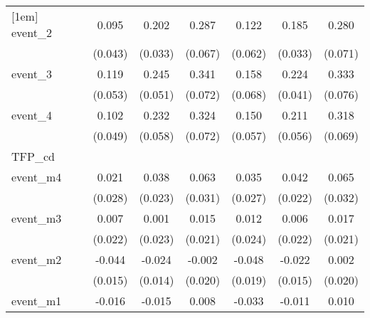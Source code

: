 {\begin{tabular}{l*{6}{c}}
[1em]
event\_2     &       0.095\sym{*}  &       0.202\sym{***}&       0.287\sym{***}&       0.122\sym{*}  &       0.185\sym{***}&       0.280\sym{***}\\
            &     (0.043)         &     (0.033)         &     (0.067)         &     (0.062)         &     (0.033)         &     (0.071)         \\
[1em]
event\_3     &       0.119\sym{*}  &       0.245\sym{***}&       0.341\sym{***}&       0.158\sym{*}  &       0.224\sym{***}&       0.333\sym{***}\\
            &     (0.053)         &     (0.051)         &     (0.072)         &     (0.068)         &     (0.041)         &     (0.076)         \\
[1em]
event\_4     &       0.102\sym{*}  &       0.232\sym{***}&       0.324\sym{***}&       0.150\sym{**} &       0.211\sym{***}&       0.318\sym{***}\\
            &     (0.049)         &     (0.058)         &     (0.072)         &     (0.057)         &     (0.056)         &     (0.069)         \\
\hline
TFP\_cd      &                     &                     &                     &                     &                     &                     \\
event\_m4    &       0.021         &       0.038         &       0.063\sym{*}  &       0.035         &       0.042         &       0.065\sym{*}  \\
            &     (0.028)         &     (0.023)         &     (0.031)         &     (0.027)         &     (0.022)         &     (0.032)         \\
[1em]
event\_m3    &       0.007         &       0.001         &       0.015         &       0.012         &       0.006         &       0.017         \\
            &     (0.022)         &     (0.023)         &     (0.021)         &     (0.024)         &     (0.022)         &     (0.021)         \\
[1em]
event\_m2    &      -0.044\sym{**} &      -0.024         &      -0.002         &      -0.048\sym{*}  &      -0.022         &       0.002         \\
            &     (0.015)         &     (0.014)         &     (0.020)         &     (0.019)         &     (0.015)         &     (0.020)         \\
[1em]
event\_m1    &      -0.016         &      -0.015         &       0.008         &      -0.033\sym{*}  &      -0.011         &       0.010         \\

\end{tabular}}
